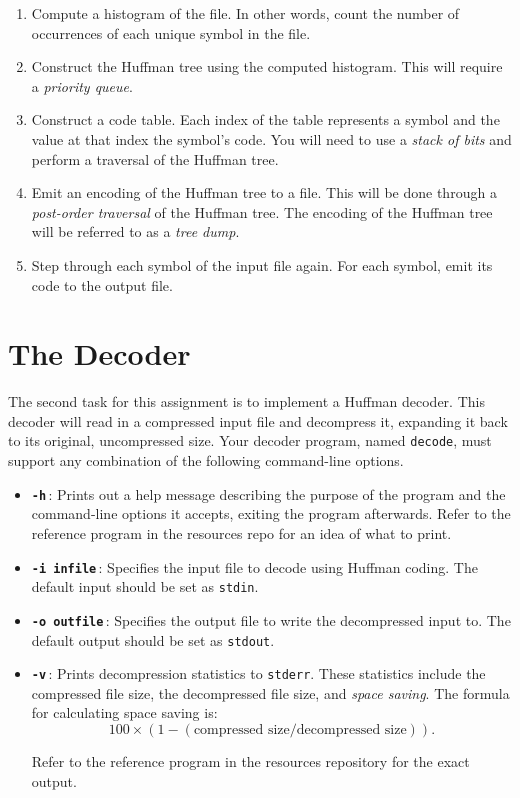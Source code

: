 \documentclass[11pt]{article}
\begin{document}
\begin{enumerate}
  \item Compute a histogram of the file. In other words, count the
    number of occurrences of each unique symbol in the file.

  \item Construct the Huffman tree using the computed histogram. This
    will require a \emph{priority queue}.

  \item Construct a code table. Each index of the table represents a
    symbol and the value at that index the symbol's code. You will need
    to use a \emph{stack of bits} and perform a traversal of the Huffman
    tree.

  \item Emit an encoding of the Huffman tree to a file. This will be
    done through a \emph{post-order traversal} of the Huffman tree. The
    encoding of the Huffman tree will be referred to as a \emph{tree
    dump}.

  \item Step through each symbol of the input file again. For each
    symbol, emit its code to the output file.
\end{enumerate}

\section{The Decoder}

The second task for this assignment is to implement a Huffman decoder.
This decoder will read in a compressed input file and decompress it,
expanding it back to its original, uncompressed size. Your decoder
program, named \texttt{decode}, must support any combination of the
following command-line options.

\begin{itemize}
  \item \textbf{\texttt{-h}}\,: Prints out a help message describing the purpose
    of the program and the command-line options it accepts, exiting the
    program afterwards. Refer to the reference program in the resources
    repo for an idea of what to print.

  \item \textbf{\texttt{-i infile}}\,: Specifies the input file to
    decode using Huffman coding. The default input should be set as
    \texttt{stdin}.

  \item \textbf{\texttt{-o outfile}}\,: Specifies the output file to
    write the decompressed input to. The default output should be set as
    \texttt{stdout}.

  \item \textbf{\texttt{-v}}\,: Prints decompression statistics to
    \texttt{stderr}. These statistics include the compressed file size,
    the decompressed file size, and \emph{space saving}. The formula for
    calculating space saving is:
    \[
      100 \times (1 - (\text{compressed size} / \text{decompressed
      size})).
    \]

    Refer to the reference program in the resources repository for the
    exact output.
\end{itemize}
\end{document}
